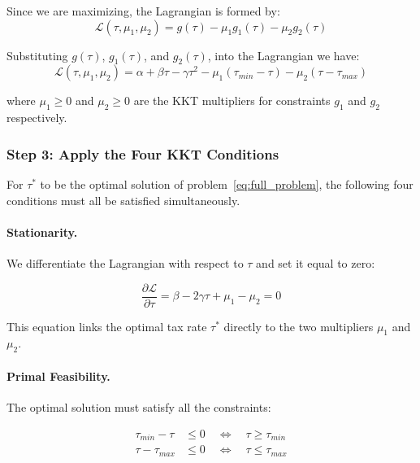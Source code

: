 \documentclass[12pt,a4paper]{report}
\theoremstyle{definition}
\theoremstyle{plain}
\theoremstyle{remark}
\newcommand{\lagr}{\mathcal{L}}
\newcommand{\taustar}{\tau^{*}}
\begin{document}
	
	Since we are maximizing, the Lagrangian 
	is formed by:
	\\
	
	\begin{equation}
		\lagr(\tau, \mu_1, \mu_2) = g(\tau) - \mu_1 g_1(\tau) 
		- \mu_2 g_2(\tau)
	\end{equation}
	
	Substituting $g(\tau)$, $g_1(\tau)$, and $g_2(\tau)$, into the Lagrangian we have:
	\begin{equation}
		\lagr(\tau, \mu_1, \mu_2) = \alpha + \beta\tau 
		- \gamma\tau^2 - \mu_1(\tau_{min} - \tau) 
		- \mu_2(\tau - \tau_{max})
		\label{eq:lagrangian}
	\end{equation}
	
	where $\mu_1 \geq 0$ and $\mu_2 \geq 0$ are the KKT multipliers 
	for constraints $g_1$ and $g_2$ respectively. 
	
	\subsubsection{Step 3: Apply the Four KKT Conditions}
	
	For $\tau^*$ to be the optimal solution of 
	problem~\eqref{eq:full_problem}, the following four conditions 
	must all be satisfied simultaneously.
	
	\paragraph{Stationarity.}
	
	We differentiate the Lagrangian with respect to $\tau$ and set 
	it equal to zero:
	
	\begin{equation}
		\frac{\partial \lagr}{\partial \tau} = \beta - 2\gamma\tau 
		+ \mu_1 - \mu_2 = 0
		\label{eq:stationarity}
	\end{equation}
	
	This equation links the optimal tax rate $\taustar$ directly 
	to the two multipliers $\mu_1$ and $\mu_2$.
	
	\paragraph{Primal Feasibility.}
	
	The optimal solution must satisfy all the constraints:
	
	\begin{align}
		\tau_{min} - \tau &\leq 0 \quad \Longleftrightarrow \quad 
		\tau \geq \tau_{min} \label{eq:pf1}\\
		\tau - \tau_{max} &\leq 0 \quad \Longleftrightarrow \quad 
		\tau \leq \tau_{max} \label{eq:pf2}
	\end{align}
	
\end{document}
